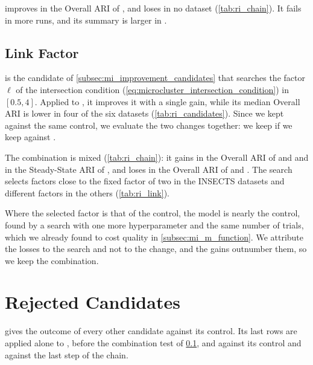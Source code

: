  improves  in the Overall ARI of \InsectsReoccurring, and loses in no dataset (\cref{tab:ri_chain}). It fails in more runs, and its summary is larger in \InsectsReoccurring.

\subsection{Link Factor}
\label{subsec:ri_link}

 is the candidate of \cref{subsec:mi_improvement_candidates} that searches the factor $\ell$ of the intersection condition (\cref{eq:microcluster_intersection_condition}) in $[0.5, 4]$. Applied to , it improves it with a single gain, while its median Overall ARI is lower in four of the six datasets (\cref{tab:ri_candidates}). Since we kept  against the same control, we evaluate the two changes together: we keep  if we keep  against .

The combination is mixed (\cref{tab:ri_chain}): it gains in the Overall ARI of \GasDrift and \Pendigits and in the Steady-State ARI of \GasDrift, and loses in the Overall ARI of \InsectsIncremental and \InsectsReoccurring. The search selects factors close to the fixed factor of two in the INSECTS datasets and different factors in the others (\cref{tab:ri_link}).



Where the selected factor is that of the control, the model is nearly the control, found by a search with one more hyperparameter and the same number of trials, which we already found to cost quality in \cref{subsec:mi_m_function}. We attribute the losses to the search and not to the change, and the gains outnumber them, so we keep the combination.

\section{Rejected Candidates}
\label{sec:ri_rejected}

 gives the outcome of every other candidate against its control. Its last rows are  applied alone to , before the combination test of \cref{subsec:ri_link}, and  against its control and against the last step of the chain.

